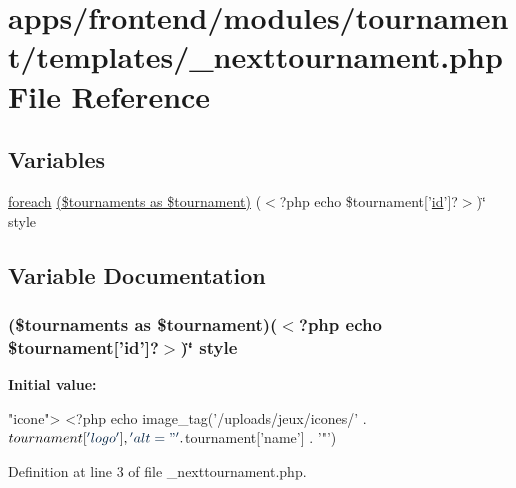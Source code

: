 \hypertarget{frontend_2modules_2tournament_2templates_2__nexttournament_8php}{\section{apps/frontend/modules/tournament/templates/\-\_\-nexttournament.php File Reference}
\label{frontend_2modules_2tournament_2templates_2__nexttournament_8php}
}
\subsection*{Variables}
\begin{DoxyCompactItemize}
\item 
\hyperlink{presse_2modules_2news_2templates_2index_success_8php_abc56db52b2e9a59bcd5c9e45ac5cb332}{foreach} \hyperlink{frontend_2modules_2tournament_2templates_2__nexttournament_8php_a64107c293eeabff8225523c0f3f6decc}{(\$tournaments as \$tournament)} ($<$?php echo \$tournament\mbox{[}'\hyperlink{live_2modules_2team_2templates_2management_success_8php_ad9851c94d15b310fef9eaded57c23ddf}{id}'\mbox{]}?$>$)\char`\"{} style
\end{DoxyCompactItemize}


\subsection{Variable Documentation}
\hypertarget{frontend_2modules_2tournament_2templates_2__nexttournament_8php_a64107c293eeabff8225523c0f3f6decc}{
\subsubsection[{(\$tournaments as \$tournament)}]{ (\$tournaments as \$tournament)($<$?php echo \$tournament\mbox{[}'{\bf id}'\mbox{]}?$>$)\char`\"{} style}}\label{frontend_2modules_2tournament_2templates_2__nexttournament_8php_a64107c293eeabff8225523c0f3f6decc}
{\bfseries Initial value\-:}
\begin{DoxyCode}
\textcolor{stringliteral}{"icone"}>
                    <?php echo  image\_tag(\textcolor{stringliteral}{'/uploads/jeux/icones/'} . $tournament
      [\textcolor{stringliteral}{'logo'}], \textcolor{stringliteral}{'alt="'} . $tournament[\textcolor{stringliteral}{'name'}] . \textcolor{charliteral}{'"'})
\end{DoxyCode}


Definition at line 3 of file \-\_\-nexttournament.\-php.

